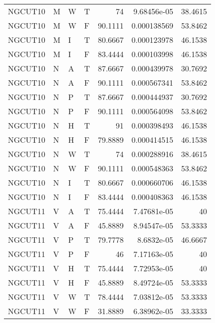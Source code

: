 \begin{longtable}{llllrrr}
    NGCUT10  & M     & W     & T          & 74         & 9.68456e-05 & 38.4615  \\
    NGCUT10  & M     & W     & F          & 90.1111    & 0.000138569 & 53.8462  \\
    NGCUT10  & M     & I     & T          & 80.6667    & 0.000123978 & 46.1538  \\
    NGCUT10  & M     & I     & F          & 83.4444    & 0.000103998 & 46.1538  \\
    NGCUT10  & N     & A     & T          & 87.6667    & 0.000439978 & 30.7692  \\
    NGCUT10  & N     & A     & F          & 90.1111    & 0.000567341 & 53.8462  \\
    NGCUT10  & N     & P     & T          & 87.6667    & 0.000444937 & 30.7692  \\
    NGCUT10  & N     & P     & F          & 90.1111    & 0.000564098 & 53.8462  \\
    NGCUT10  & N     & H     & T          & 91         & 0.000398493 & 46.1538  \\
    NGCUT10  & N     & H     & F          & 79.8889    & 0.000414515 & 46.1538  \\
    NGCUT10  & N     & W     & T          & 74         & 0.000288916 & 38.4615  \\
    NGCUT10  & N     & W     & F          & 90.1111    & 0.000548363 & 53.8462  \\
    NGCUT10  & N     & I     & T          & 80.6667    & 0.000660706 & 46.1538  \\
    NGCUT10  & N     & I     & F          & 83.4444    & 0.000408363 & 46.1538  \\
    NGCUT11  & V     & A     & T          & 75.4444    & 7.47681e-05 & 40       \\
    NGCUT11  & V     & A     & F          & 45.8889    & 8.94547e-05 & 53.3333  \\
    NGCUT11  & V     & P     & T          & 79.7778    & 8.6832e-05  & 46.6667  \\
    NGCUT11  & V     & P     & F          & 46         & 7.17163e-05 & 40       \\
    NGCUT11  & V     & H     & T          & 75.4444    & 7.72953e-05 & 40       \\
    NGCUT11  & V     & H     & F          & 45.8889    & 8.49724e-05 & 53.3333  \\
    NGCUT11  & V     & W     & T          & 78.4444    & 7.03812e-05 & 53.3333  \\
    NGCUT11  & V     & W     & F          & 31.8889    & 6.38962e-05 & 33.3333  \\

\end{longtable}

